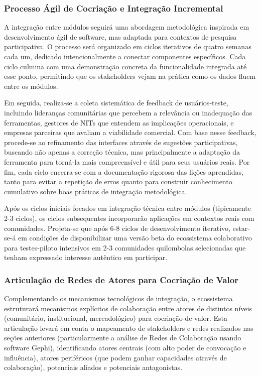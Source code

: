 \subsubsection{Processo Ágil de Cocriação e Integração Incremental}

A integração entre módulos seguirá uma abordagem metodológica inspirada em desenvolvimento ágil de software, mas adaptada para contextos de pesquisa participativa. O processo será organizado em ciclos iterativos de quatro semanas cada um, dedicado intencionalmente a conectar componentes específicos. Cada ciclo culmina com uma demonstração concreta da funcionalidade integrada até esse ponto, permitindo que os stakeholders vejam na prática como os dados fluem entre os módulos. 

Em seguida, realiza-se a coleta sistemática de feedback de usuários-teste, incluindo lideranças comunitárias que percebem a relevância ou inadequação das ferramentas, gestores de NITs que entendem as implicações operacionais, e empresas parceiras que avaliam a viabilidade comercial. Com base nesse feedback, procede-se ao refinamento das interfaces através de sugestões participativas, buscando não apenas a correção técnica, mas principalmente a adaptação da ferramenta para torná-la mais compreensível e útil para seus usuários reais. Por fim, cada ciclo encerra-se com a documentação rigorosa das lições aprendidas, tanto para evitar a repetição de erros quanto para construir conhecimento cumulativo sobre boas práticas de integração metodológica.

Após os ciclos iniciais focados em integração técnica entre módulos (tipicamente 2-3 ciclos), os ciclos subsequentes incorporarão aplicações em contextos reais com comunidades. Projeta-se que após 6-8 ciclos de desenvolvimento iterativo, estar-se-á em condições de disponibilizar uma versão beta do ecossistema colaborativo para testes-piloto intensivos em 2-3 comunidades quilombolas selecionadas que tenham expressado interesse autêntico em participar.

\subsubsection{Articulação de Redes de Atores para Cocriação de Valor}

Complementando os mecanismos tecnológicos de integração, o ecossistema estruturará mecanismos explícitos de colaboração entre atores de distintos níveis (comunitário, institucional, mercadológico) para cocriação de valor. Esta articulação levará em conta o mapeamento de stakeholders e redes realizados nas seções anteriores (particularmente a análise de Redes de Colaboração usando software Gephi), identificando atores centrais (com alto poder de convocação e influência), atores periféricos (que podem ganhar capacidades através de colaboração), potenciais aliados e potenciais antagonistas. 

